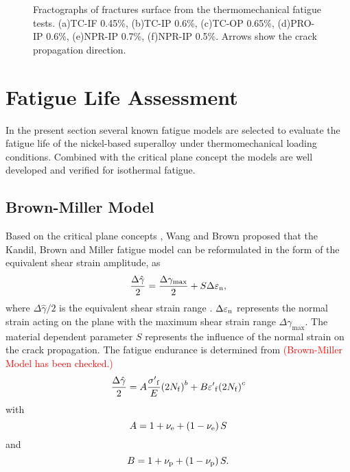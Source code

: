 \documentclass[preprint,5p,twocolumn,11pt,sort&compress]{elsarticle}
\newcommand{\marked}[1]{\textcolor{red}{#1}}
\begin{document}
\begin{figure*}
  \caption{Fractographs of fractures surface from the thermomechanical fatigue tests. (a)TC-IF 0.45\%, (b)TC-IP 0.6\%, (c)TC-OP 0.65\%, (d)PRO-IP 0.6\%, (e)NPR-IP 0.7\%, (f)NPR-IP 0.5\%.  Arrows show the crack propagation direction.}
  \label{Fig:crack_propagation}
\end{figure*}

\section{Fatigue Life Assessment}

In  the present section several known fatigue models are selected to evaluate the fatigue life of the nickel-based superalloy under thermomechanical loading conditions. Combined with the critical plane concept the models are well developed and verified for isothermal fatigue.

\subsection{Brown-Miller Model}
Based on the critical plane concepts \cite{Brown2006}, Wang and Brown \cite{Wang1993} proposed that the Kandil, Brown and Miller fatigue model \cite{Kandil1982} can be reformulated in the form of the equivalent shear strain amplitude, as
\begin{equation}
\frac{{\Delta \hat \gamma }}{2} = \frac{{\Delta {\gamma _{\max}}}}{2} + S\Delta {\varepsilon _{\rm n}},
\label{Equ:ShearStrainBM}
\end{equation}
where ${{\Delta \hat \gamma }}/{2}$ is the equivalent shear strain range \cite{Wang1993}. $\Delta {\varepsilon _{\rm n}}$ represents the normal strain acting on the plane with the maximum shear strain range $\Delta {\gamma _{\max}}$. The material dependent parameter $S$ represents the influence of the normal strain on the crack propagation.
The fatigue endurance is determined from \marked{(Brown-Miller Model has been checked.)}
\begin{equation}
\frac{{\Delta \hat \gamma }}{2} = A\frac{{{{\sigma '}_{\rm f}}}}{E}{\left( {2{N_{\rm f}}} \right)^b} + B{{\varepsilon '}_{\rm f}}{\left( {2{N_{\rm f}}} \right)^c}
\end{equation}
with
\[A = 1 + {\nu _{\rm e}} + \left( {1 - {\nu _{\rm e}}} \right)S\]
and
\[B = 1 + {\nu _{\rm p}} + \left( {1 - {\nu _{\rm p}}} \right)S.\]
\end{document}
